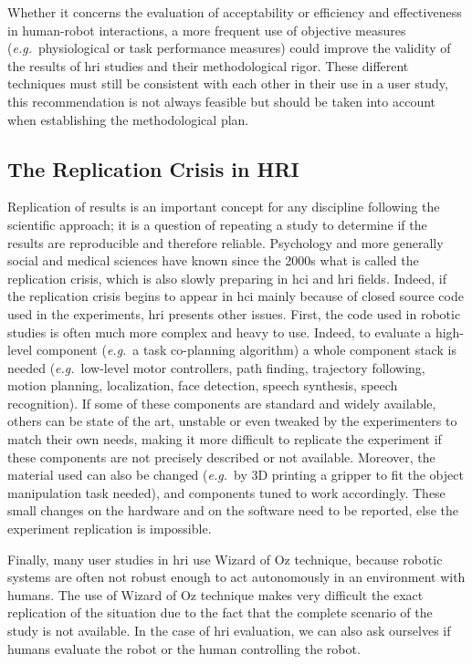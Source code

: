 \documentclass[a4paper,11pt,twoside]{StyleThese}
\begin{document}
Whether it concerns the evaluation of acceptability or efficiency and effectiveness in human-robot interactions, a more frequent use of objective measures (\textit{e.g.}~physiological or task performance measures) could improve the validity of the results of \acrshort{hri} studies and their methodological rigor. These different techniques must still be consistent with each other in their use in a user study, this recommendation is not always feasible but should be taken into account when establishing the methodological plan.

\subsection{The Replication Crisis in HRI}
\label{sec:replication}

Replication of results is an important concept for any discipline following the scientific approach; it is a question of repeating a study to determine if the results are reproducible and therefore reliable. Psychology and more generally social and medical sciences have known since the 2000s what is called the replication crisis, which is also slowly preparing in \acrshort{hci} and \acrshort{hri} fields.
Indeed, if the replication crisis begins to appear in \acrshort{hci} \cite{echtler2018open} mainly because of closed source code used in the experiments, \acrshort{hri} presents other issues. First, the code used in robotic studies is often much more complex and heavy to use. Indeed, to evaluate a high-level component (\textit{e.g.}~a task co-planning algorithm) a whole component stack is needed (\textit{e.g.}~low-level motor controllers, path finding, trajectory following, motion planning, localization, face detection, speech synthesis, speech recognition). If some of these components are standard and widely available, others can be state of the art, unstable or even tweaked by the experimenters to match their own needs, making it more difficult to replicate the experiment if these components are not precisely described or not available. Moreover, the material used can also be changed (\textit{e.g.}~by 3D printing a gripper to fit the object manipulation task needed), and components tuned to work accordingly. These small changes on the hardware and on the software need to be reported, else the experiment replication is impossible.

Finally, many user studies in \acrshort{hri} use Wizard of Oz technique, because robotic systems are often not robust enough to act autonomously in an environment with humans. The use of Wizard of Oz technique makes very difficult the exact replication of the situation due to the fact that the complete scenario of the study is not available. 
In the case of \acrshort{hri} evaluation, we can also ask ourselves if humans evaluate the robot or the human controlling the robot.
\end{document}
